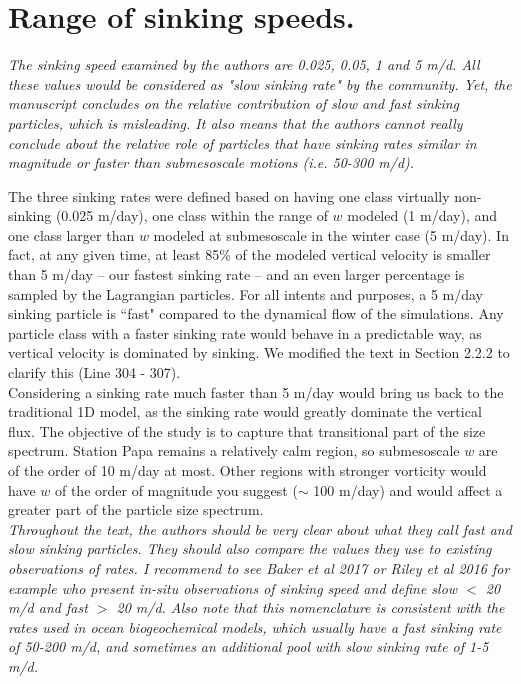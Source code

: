 \documentclass[12pt,letter]{article}
\begin{document}
\section*{Range of sinking speeds.}
\textit{The sinking speed examined by the authors are 0.025, 0.05, 1 and 5 m/d. All these values would be considered as "slow sinking rate" by the community. Yet, the manuscript concludes on the relative contribution of slow and fast sinking particles, which is misleading. It also means that the authors cannot really conclude about the relative role of particles that have sinking rates similar in magnitude or faster than submesoscale motions (i.e. 50-300 m/d).\\}

The three sinking rates were defined based on having one class virtually non-sinking (0.025 m/day), one class within the range of $w$ modeled (1 m/day), and one class larger than $w$ modeled at submesoscale in the winter case (5 m/day). In fact, at any given time, at least 85\% of the modeled vertical velocity is smaller than 5 m/day -- our fastest sinking rate -- and an even larger percentage is sampled by the Lagrangian particles. For all intents and purposes, a 5 m/day sinking particle is ``fast" compared to the dynamical flow of the simulations. Any particle class with a faster sinking rate would behave in a predictable way, as vertical velocity is dominated by sinking. We modified the text in Section 2.2.2 to clarify this (Line 304 - 307).\\

Considering a sinking rate much faster than 5 m/day would bring us back to the traditional 1D model, as the sinking rate would greatly dominate the vertical flux. The objective of the study is to capture that transitional part of the size spectrum. Station Papa remains a relatively calm region, so submesoscale $w$ are of the order of 10 m/day at most. Other regions with stronger vorticity would have $w$ of the order of magnitude you suggest ($\sim$ 100 m/day) and would affect a greater part of the particle size spectrum.\\

\textit{Throughout the text, the authors should be very clear about what they call fast and slow sinking particles. They should also compare the values they use to existing observations of rates. I recommend to see Baker et al 2017 or Riley et al 2016 for example who present in-situ observations of sinking speed and define slow $<$ 20 m/d and fast $>$ 20 m/d. Also note that this nomenclature is consistent with the rates used in ocean biogeochemical models, which usually have a fast sinking rate of 50-200 m/d, and sometimes an additional pool with slow sinking rate of 1-5 m/d.\\}
\end{document}
